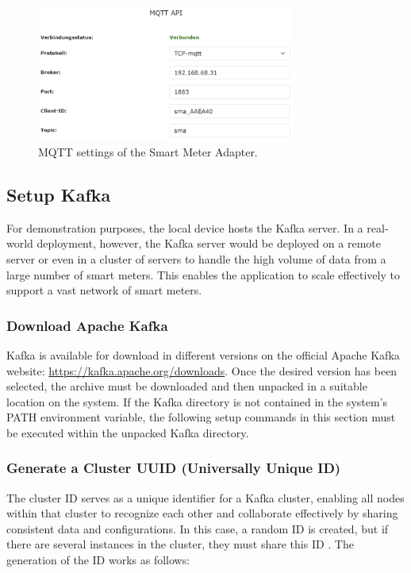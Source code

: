 \begin{figure}[ht]
    \centering
    \includegraphics[width=8.5cm]{images/sma.png}
    \caption{MQTT settings of the Smart Meter Adapter.}
    \label{fig:sma}
\end{figure}

\subsection{Setup Kafka}

For demonstration purposes, the local device hosts the Kafka server. In a real-world deployment, however, the Kafka server would be deployed on a remote server or even in a cluster of servers to handle the high volume of data from a large number of smart meters. This enables the application to scale effectively to support a vast network of smart meters.

\subsubsection{Download Apache Kafka} Kafka is available for download in different versions on the official Apache Kafka website: \url{https://kafka.apache.org/downloads}. Once the desired version has been selected, the archive must be downloaded and then unpacked in a suitable location on the system. If the Kafka directory is not contained in the system's PATH environment variable, the following setup commands in this section must be executed within the unpacked Kafka directory.

\subsubsection{Generate a Cluster UUID (Universally Unique ID)} The cluster ID serves as a unique identifier for a Kafka cluster, enabling all nodes within that cluster to recognize each other and collaborate effectively by sharing consistent data and configurations. In this case, a random ID is created, but if there are several instances in the cluster, they must share this ID \cite{shapira2021kafka}. The generation of the ID works as follows:

